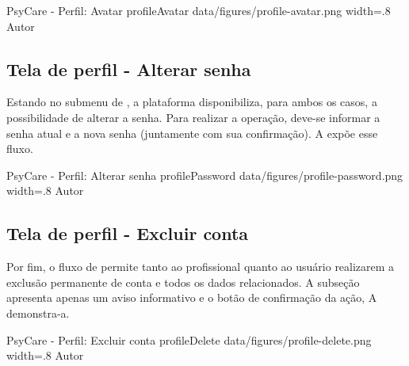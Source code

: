 \image
    {PsyCare - Perfil: Avatar}
    {profileAvatar}
    {data/figures/profile-avatar.png}
    {width=.8\textwidth}
    {Autor}

\subsection{Tela de perfil - Alterar senha}
\label{sec:perfilAvatar}
Estando no submenu de , a plataforma disponibiliza, para ambos os casos, a possibilidade de alterar a senha. Para realizar a operação, deve-se informar a senha atual e a nova senha (juntamente com sua confirmação). A  expõe esse fluxo.

\image
    {PsyCare - Perfil: Alterar senha}
    {profilePassword}
    {data/figures/profile-password.png}
    {width=.8\textwidth}
    {Autor}

\subsection{Tela de perfil - Excluir conta}
\label{sec:perfilExcluir}
Por fim, o fluxo de  permite tanto ao profissional quanto ao usuário realizarem a exclusão permanente de conta e todos os dados relacionados. A subseção apresenta apenas um aviso informativo e o botão de confirmação da ação, A  demonstra-a.

\image
    {PsyCare - Perfil: Excluir conta}
    {profileDelete}
    {data/figures/profile-delete.png}
    {width=.8\textwidth}
    {Autor}